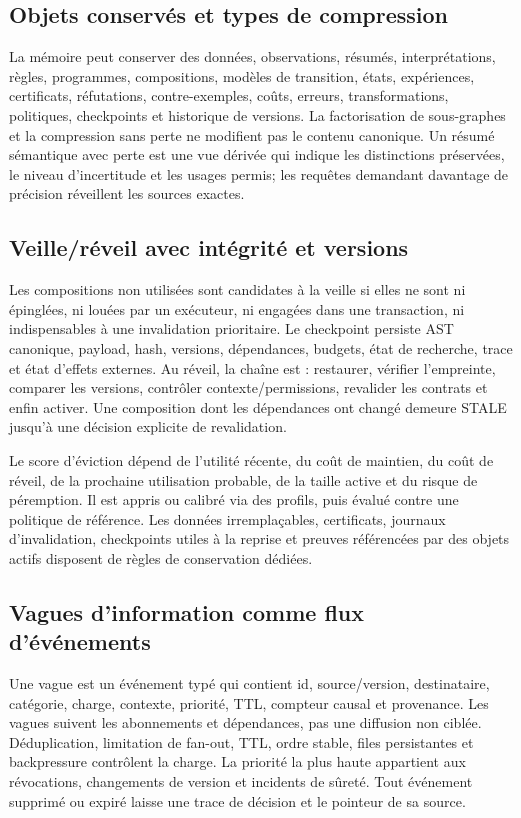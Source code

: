 \documentclass[11pt,a4paper]{article}
\newcommand{\State}[1]{\textsf{#1}}
\begin{document}
\subsection{Objets conservés et types de compression}
La mémoire peut conserver des données, observations, résumés, interprétations, règles, programmes, compositions, modèles de transition, états, expériences, certificats, réfutations, contre-exemples, coûts, erreurs, transformations, politiques, checkpoints et historique de versions. La factorisation de sous-graphes et la compression sans perte ne modifient pas le contenu canonique. Un résumé sémantique avec perte est une vue dérivée qui indique les distinctions préservées, le niveau d'incertitude et les usages permis; les requêtes demandant davantage de précision réveillent les sources exactes.

\subsection{Veille/réveil avec intégrité et versions}
Les compositions non utilisées sont candidates à la veille si elles ne sont ni épinglées, ni louées par un exécuteur, ni engagées dans une transaction, ni indispensables à une invalidation prioritaire. Le checkpoint persiste AST canonique, payload, hash, versions, dépendances, budgets, état de recherche, trace et état d'effets externes. Au réveil, la chaîne est : restaurer, vérifier l'empreinte, comparer les versions, contrôler contexte/permissions, revalider les contrats et enfin activer. Une composition dont les dépendances ont changé demeure \State{STALE} jusqu'à une décision explicite de revalidation.

Le score d'éviction dépend de l'utilité récente, du coût de maintien, du coût de réveil, de la prochaine utilisation probable, de la taille active et du risque de péremption. Il est appris ou calibré via des profils, puis évalué contre une politique de référence. Les données irremplaçables, certificats, journaux d'invalidation, checkpoints utiles à la reprise et preuves référencées par des objets actifs disposent de règles de conservation dédiées.

\subsection{Vagues d'information comme flux d'événements}
Une vague est un événement typé qui contient id, source/version, destinataire, catégorie, charge, contexte, priorité, TTL, compteur causal et provenance. Les vagues suivent les abonnements et dépendances, pas une diffusion non ciblée. Déduplication, limitation de fan-out, TTL, ordre stable, files persistantes et backpressure contrôlent la charge. La priorité la plus haute appartient aux révocations, changements de version et incidents de sûreté. Tout événement supprimé ou expiré laisse une trace de décision et le pointeur de sa source.
\end{document}
